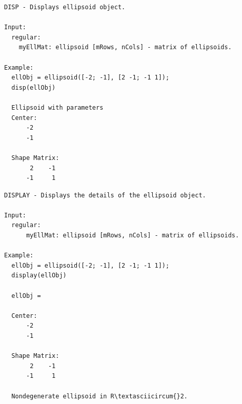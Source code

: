 \documentclass[letterpaper,10pt,english]{sphinxmanual}
\begin{document}
\begin{Verbatim}[commandchars=\\\{\}]
DISP - Displays ellipsoid object.

Input:
  regular:
    myEllMat: ellipsoid [mRows, nCols] - matrix of ellipsoids.

Example:
  ellObj = ellipsoid([-2; -1], [2 -1; -1 1]);
  disp(ellObj)

  Ellipsoid with parameters
  Center:
      -2
      -1

  Shape Matrix:
       2    -1
      -1     1
\end{Verbatim}

\begin{Verbatim}[commandchars=\\\{\}]
DISPLAY - Displays the details of the ellipsoid object.

Input:
  regular:
      myEllMat: ellipsoid [mRows, nCols] - matrix of ellipsoids.

Example:
  ellObj = ellipsoid([-2; -1], [2 -1; -1 1]);
  display(ellObj)

  ellObj =

  Center:
      -2
      -1

  Shape Matrix:
       2    -1
      -1     1

  Nondegenerate ellipsoid in R\textasciicircum{}2.
\end{Verbatim}
\end{document}
